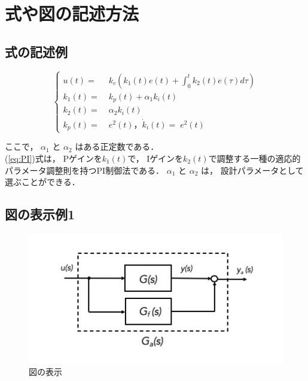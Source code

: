 \documentclass[12pt,fleqn]{jarticle}
\date{}
\begin{document}

\clearpage
%
\newpage



\section{式や図の記述方法}
\subsection{式の記述例}
\begin{equation}
    \left\{
    \begin{aligned}
    u(t) =& \; k_c \left(k_1(t) e(t) + \int_0^t k_2(t) e(\tau) d\tau \right) \\
    {k}_1(t) =& \; k_p(t) + \alpha_1 k_i(t) \\
    {k}_2(t) =& \; \alpha_2 k_i(t)\\
    k_p(t) =& \; e^2(t)， 
    \dot k_i(t) = \; e^2(t)
    \end{aligned}
    \right.
    \label{eq:PI}
\end{equation}

ここで， $\alpha_1$ と $\alpha_2$ はある正定数である．\\
(\ref{eq:PI})式は， Pゲインを${k_1}(t)$で， Iゲインを${k_2}(t)$で調整する一種の適応的パラメータ調整則を持つPI制御法である．
$\alpha_1$ と $\alpha_2$ は， 設計パラメータとして選ぶことができる．
\subsection{図の表示例1}
\begin{figure}[h]
    \centering
    \includegraphics[scale=0.7]{./fig/PFC.jpg}
    \caption{図の表示}
    \label{fig:sample_1}
\end{figure}
\end{document}
